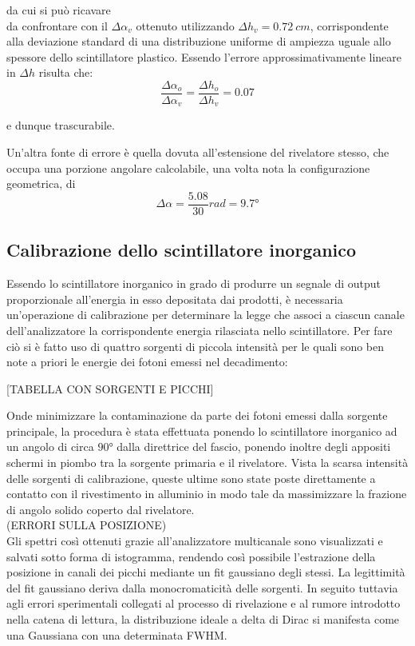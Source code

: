 \documentclass[11pt]{article}
\begin{document}
da cui si può ricavare \\

da confrontare con il $\Delta \alpha_v$ ottenuto utilizzando $\Delta h_v = 0.72 \ cm$, corrispondente alla deviazione standard di una distribuzione uniforme di ampiezza uguale allo spessore dello scintillatore plastico. Essendo l'errore approssimativamente lineare in $\Delta h$ risulta che: \\
\begin{equation}
\frac{\Delta \alpha_o}{\Delta \alpha_v} = \frac{\Delta h_o}{\Delta h_v} = 0.07 
\end{equation}

e dunque trascurabile.

Un'altra fonte di errore è quella dovuta all'estensione del rivelatore stesso, che occupa una porzione angolare calcolabile, una volta nota la configurazione geometrica, di \\
\begin{equation}
\Delta \alpha = \frac{5.08}{30} rad = 9.7°
\nonumber
\end{equation}





\subsection{Calibrazione dello scintillatore inorganico}

Essendo lo scintillatore inorganico in grado di produrre un segnale di output proporzionale all'energia in esso depositata dai prodotti, è necessaria un'operazione di calibrazione per determinare la legge che associ a ciascun canale dell'analizzatore la corrispondente energia rilasciata nello scintillatore. 
Per fare ciò si è fatto uso di quattro sorgenti di piccola intensità per le quali sono ben note a priori le energie dei fotoni emessi nel decadimento:

[TABELLA CON SORGENTI E PICCHI]

Onde minimizzare la contaminazione da parte dei fotoni emessi dalla sorgente principale, la procedura è stata effettuata ponendo lo scintillatore inorganico ad un angolo di circa $90°$ dalla direttrice del fascio, ponendo inoltre degli appositi schermi in piombo tra la sorgente primaria e il rivelatore. Vista la scarsa intensità delle sorgenti di calibrazione, queste ultime sono state poste direttamente a contatto con il rivestimento in alluminio in modo tale da massimizzare la frazione di angolo solido coperto dal rivelatore.\\
(ERRORI SULLA POSIZIONE)\\
Gli spettri così ottenuti grazie all'analizzatore multicanale sono visualizzati e salvati sotto forma di istogramma, rendendo così possibile l'estrazione della posizione in canali dei picchi mediante un fit gaussiano degli stessi. La legittimità del fit gaussiano deriva dalla monocromaticità delle sorgenti. In seguito tuttavia agli errori sperimentali collegati al processo di rivelazione e al rumore introdotto nella catena di lettura, la distribuzione ideale a delta di Dirac si manifesta come una Gaussiana con una determinata FWHM.\\
\end{document}
